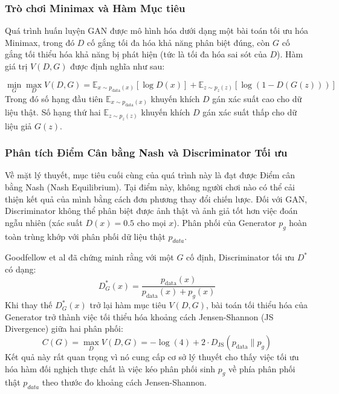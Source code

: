 \subsubsection{Trò chơi Minimax và Hàm Mục tiêu}
Quá trình huấn luyện GAN được mô hình hóa dưới dạng một bài toán tối ưu hóa Minimax, 
trong đó $D$ cố gắng tối đa hóa khả năng phân biệt đúng, còn $G$ cố gắng tối thiểu hóa khả 
năng bị phát hiện (tức là tối đa hóa sai sót của $D$). Hàm giá trị $V(D, G)$ được định nghĩa 
như sau:

\begin{equation}
\min_G \max_D V(D, G) = \mathbb{E}_{x \sim p_{\text{data}}(x)}[\log D(x)] + \mathbb{E}_{z \sim p_z(z)}[\log(1 - D(G(z)))]
\end{equation}
Trong đó số hạng đầu tiên $\mathbb{E}_{x \sim p_{\text{data}}(x)}$ khuyến khích $D$ gán xác suất 
cao cho dữ liệu thật.
Số hạng thứ hai $\mathbb{E}_{z \sim p_z(z)}$ khuyến khích $D$ gán xác suất thấp cho dữ liệu 
giả $G(z)$.\cite{Goodfellow2014}

\subsubsection{Phân tích Điểm Cân bằng Nash và Discriminator Tối ưu}
Về mặt lý thuyết, mục tiêu cuối cùng của quá trình này là đạt được Điểm cân bằng Nash 
(Nash Equilibrium). Tại điểm này, không người chơi nào có thể cải thiện kết quả của mình 
bằng cách đơn phương thay đổi chiến lược.\cite{Jabbar2021}
Đối với GAN, Discriminator không thể phân biệt được ảnh thật và ảnh giả tốt hơn việc đoán 
ngẫu nhiên (xác suất $D(x) = 0.5$ cho mọi $x$).
Phân phối của Generator $p_g$ hoàn toàn trùng khớp với phân phối dữ liệu thật $p_{data}$.

Goodfellow et al \cite{Goodfellow2014} đã chứng minh rằng với một $G$ cố định, Discriminator tối ưu $D^*$ có dạng:
\begin{equation}
\label{eq:optimal_discriminator}
D^*_G(x) = \frac{p_{\text{data}}(x)}{p_{\text{data}}(x) + p_g(x)}
\end{equation}
Khi thay thế $D^*_G(x)$ trở lại hàm mục tiêu $V(D, G)$, bài toán tối thiểu hóa của Generator 
trở thành việc tối thiểu hóa khoảng cách Jensen-Shannon (JS Divergence) giữa hai phân phối:
\begin{equation}
\label{eq:global_optimum}
C(G) = \max_D V(D, G) = -\log(4) + 2 \cdot D_{\text{JS}}(p_{\text{data}} \parallel p_g)
\end{equation}
Kết quả này rất quan trọng vì nó cung cấp cơ sở lý thuyết cho thấy việc tối ưu hóa hàm đối 
nghịch thực chất là việc kéo phân phối sinh $p_g$ về phía phân phối thật $p_{data}$ theo thước 
đo khoảng cách Jensen-Shannon.

